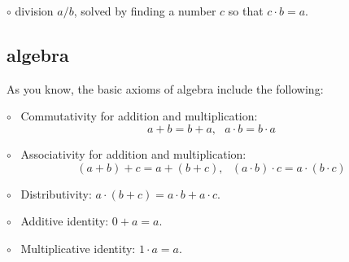 \documentclass[11pt, oneside]{article}
\begin{document}
$\circ$ division $a/b$, solved by finding a number $c$ so that $c \cdot b = a$.

\subsection*{algebra}
As you know, the basic axioms of algebra include the following:

$\circ$ \ Commutativity for addition and multiplication: 
\[ a + b = b + a, \ \ \ a \cdot b = b \cdot a \]

$\circ$ \  Associativity for addition and multiplication:
\[ (a + b) + c = a + (b + c), \ \ \ (a \cdot b) \cdot c = a \cdot (b \cdot c) \]

$\circ$ \ Distributivity:  $a \cdot (b + c) = a \cdot b + a \cdot c$.

$\circ$ \ Additive identity:  $0 + a = a$.

$\circ$ \ Multiplicative identity:  $1 \cdot a = a$.
\end{document}
